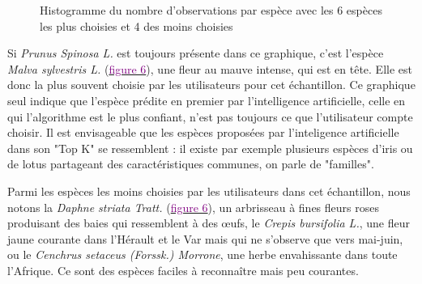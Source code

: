 \documentclass[a4paper,12pt]{article}
\begin{document}
\vspace{-0.4cm}

\begin{figure}[H]
    \centering
    
    \caption{Histogramme du nombre d'observations par espèce avec les 6 espèces les plus choisies et 4 des moins choisies}
    \label{fig4}
\end{figure}

\vspace{0.2cm}

Si \textit{Prunus Spinosa L.} est toujours présente dans ce graphique, c'est l'espèce \textit{Malva sylvestris L.} (\hyperref[fig:malva]{\textcolor{purple}{figure 6}}), une fleur au mauve intense, qui est en tête. Elle est donc la plus souvent choisie par les utilisateurs pour cet échantillon. Ce graphique seul indique que l'espèce prédite en premier par l'intelligence artificielle, celle en qui l'algorithme est le plus confiant, n'est pas toujours ce que l'utilisateur compte choisir. Il est envisageable que les espèces proposées par l'inteligence artificielle dans son "Top K" se ressemblent : il existe par exemple plusieurs espèces d'iris ou de lotus partageant des caractéristiques communes, on parle de "familles".

\vspace{0.2cm}

Parmi les espèces les moins choisies par les utilisateurs dans cet échantillon, nous notons la \textit{Daphne striata Tratt.} (\hyperref[fig:malva]{\textcolor{purple}{figure 6}}), un arbrisseau à fines fleurs roses produisant des baies qui ressemblent à des œufs, le \textit{Crepis bursifolia L.}, une fleur jaune courante dans l'Hérault et le Var mais qui ne s'observe que vers mai-juin, ou le \textit{Cenchrus setaceus (Forssk.) Morrone}, une herbe envahissante dans toute l'Afrique. Ce sont des espèces faciles à reconnaître mais peu courantes.
\end{document}
